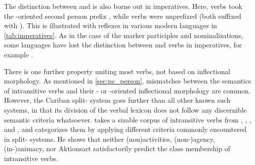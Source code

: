 



The distinction between  and  is also borne out in imperatives.
Here,  verbs took the -oriented second person prefix , while  verbs were unprefixed (both suffixed with ).
This is illustrated with reflexes in various modern languages in \cref{tab:imperatives}.
As in the case of the  marker  participles and nominalizations, some languages have lost the distinction between  and  verbs in imperatives, for example \panare.



There is one further property uniting most  verbs, not based on inflectional morphology.
As mentioned in \cref{sec:pc_person}, mismatches between the semantics of intransitive verbs and their - or -oriented inflectional morphology are common.
However, the Cariban split- system goes further than all other known such systems, in that its division of the verbal lexicon does not follow any discernible semantic criteria whatsoever.
\textcite{meira2000split} takes a sizable corpus of intransitive verbs from \trio, \kalina, \apalai, and \wayana, and categorizes them by applying different criteria commonly encountered in split- systems.
He shows that neither (non\-)activities, %
(non-)agency, %
(in-)animacy, %
nor Aktionsart %
satisfactorily predict the class membership of intransitive verbs.

